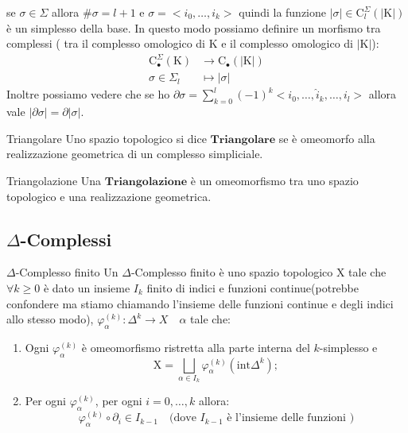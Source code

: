 \documentclass[11pt, a4paper, twoside]{article}
\begin{document}
\begin{oss}
	se $\sigma\in\Sigma$ allora $\#\sigma=l+1$ e $\sigma=<i_0,\dots,i_k>$ quindi la funzione $|\sigma|\in\text{C}_l^{\Sigma}(|\text{K}|)$ è un simplesso della base. 
	In questo modo possiamo definire un morfismo tra complessi ( tra il complesso omologico di K e il complesso omologico di $|\text{K}|$):
	\begin{align*}
		\text{C}_{\bullet}^{\Sigma}(\text{K})&\rightarrow\text{C}_{\bullet}(|\text{K}|)\\
		\sigma\in\Sigma_l&\mapsto|\sigma|
	\end{align*}
	Inoltre possiamo vedere che se ho $\partial\sigma=\sum\limits_{k=0}^{l}(-1)^k<i_0,\dots,\hat{i}_k,\dots,i_l>$ allora vale $|\partial\sigma|=\partial|\sigma|$.
\end{oss}

\begin{defn}{Triangolare}{}
	Uno spazio topologico si dice $\textbf{Triangolare}$ se è omeomorfo alla realizzazione geometrica di un complesso simpliciale.
\end{defn}

\begin{defn}{Triangolazione}{}
	Una $\textbf{Triangolazione}$ è un omeomorfismo tra uno spazio topologico e una realizzazione geometrica.
\end{defn}
\newpage
\subsection{$\Delta$-Complessi}

\begin{defn}{$\Delta$-Complesso finito}{}\label{due}
	Un $\Delta$-Complesso finito è uno spazio topologico X tale che $\forall k\geq 0$ è dato un insieme $I_k$ finito di indici e funzioni continue(potrebbe confondere ma stiamo chiamando l'insieme delle funzioni continue e degli indici allo stesso modo), $\varphi_\alpha^{(k)}:\Delta^k\rightarrow X\quad \alpha$ tale che: 
	\begin{enumerate}
		\item Ogni $\varphi_\alpha^{(k)}$ è omeomorfismo ristretta alla parte interna del $k$-simplesso e 
			\[
				\text{X}=\bigsqcup\limits_{\alpha\in I_k}\varphi_\alpha^{(k)}\left(\text{int}\Delta^k\right);
			\]
		\item Per ogni $\varphi_\alpha^{(k)}$, per ogni $i=0,\dots,k$ allora: 
			\[
				\varphi_\alpha^{(k)}\circ\partial_i\in I_{k-1}\quad \text{(dove }I_{k-1}\text{ è l'insieme delle funzioni )} 
			\]
	\end{enumerate}
\end{defn}
\end{document}
